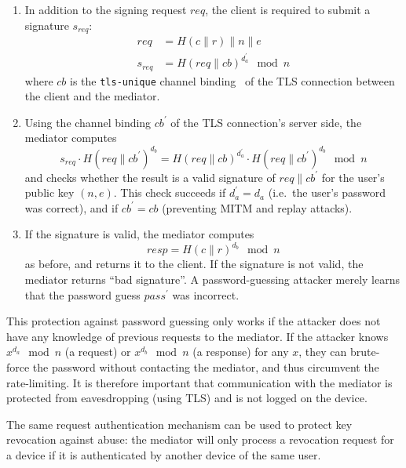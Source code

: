 \documentclass{llncs}
\newcommand*{\concat}{\mathbin{\|}}
\begin{document}
\begin{enumerate}
\item In addition to the signing request $\mathit{req}$, the client is required to submit a
signature $s_\mathit{req}$:
\begin{align}
    \mathit{req} &= H(c \concat r) \concat n \concat e \\
    s_\mathit{req} &= H(\mathit{req} \concat \mathit{cb})^{d_a^\prime} \mod n
\end{align}
where $\mathit{cb}$ is the \texttt{tls-unique} channel binding~\cite{ChannelBinding}
of the TLS connection between the client and the mediator.
\item Using the channel binding $\mathit{cb}^\prime$ of the TLS connection's server side, the
mediator computes
\begin{equation}
s_\mathit{req} \cdot H(\mathit{req} \concat \mathit{cb}^\prime)^{d_b} =
  H(\mathit{req} \concat \mathit{cb})^{d_a^\prime} \cdot
  H(\mathit{req} \concat \mathit{cb}^\prime)^{d_b} \mod n
\end{equation}
and checks whether the result is a valid signature of $\mathit{req} \concat \mathit{cb}^\prime$ for
the user's public key $(n, e)$. This check succeeds if $d_a^\prime = d_a$ (i.e.\ the user's password
was correct), and if $\mathit{cb}^\prime = \mathit{cb}$ (preventing MITM and replay attacks).
\item If the signature is valid, the mediator computes
\begin{equation}
\mathit{resp} = H(c \concat r)^{d_b} \mod n
\end{equation}
as before, and returns it to the client. If the signature is not valid, the mediator returns ``bad
signature''. A password-guessing attacker merely learns that the password guess
$\mathit{pass}^\prime$ was incorrect.
\end{enumerate}

This protection against password guessing only works if the attacker does not have any knowledge of
previous requests to the mediator. If the attacker knows $x^{d_a} \mod n$ (a request) or
$x^{d_b} \mod n$ (a response) for any $x$, they can brute-force the password without contacting the
mediator, and thus circumvent the rate-limiting.  It is therefore important that communication with
the mediator is protected from eavesdropping (using TLS) and is not logged on the device.

The same request authentication mechanism can be used to protect key revocation against abuse: the
mediator will only process a revocation request for a device if it is authenticated by another
device of the same user.
\end{document}
